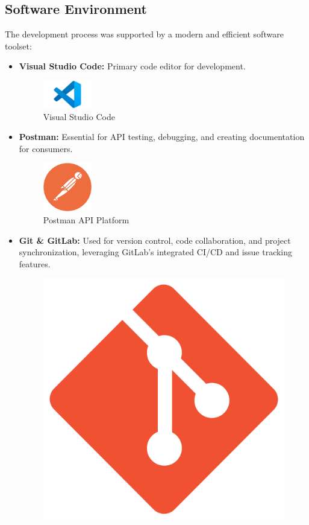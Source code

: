\subsection{Software Environment}
The development process was supported by a modern and efficient software toolset:
\begin{itemize}
    \item \textbf{Visual Studio Code:} Primary code editor for development.
    	\begin{figure}[H]
        \centering
        \includegraphics[width=0.2\textwidth]{chapters/chapter 1/figures/vscode.png}
        \caption{Visual Studio Code}
        \label{fig:vscode}
    	\end{figure}
    \item \textbf{Postman:} Essential for API testing, debugging, and creating documentation for consumers.
    	\begin{figure}[H]
        \centering
        \includegraphics[width=0.2\textwidth]{chapters/chapter 1/figures/postman.png}
        \caption{Postman API Platform}
        \label{fig:postman}
    	\end{figure}
    \item \textbf{Git \& GitLab:} Used for version control, code collaboration, and project synchronization, leveraging GitLab's integrated CI/CD and issue tracking features.
	\begin{figure}[H]
	\centering
	\begin{minipage}{0.35\textwidth}
		\centering
		\includegraphics[width=0.6\linewidth]{chapters/chapter 1/figures/git.png}

\end{minipage}
\end{figure}
\end{itemize}
